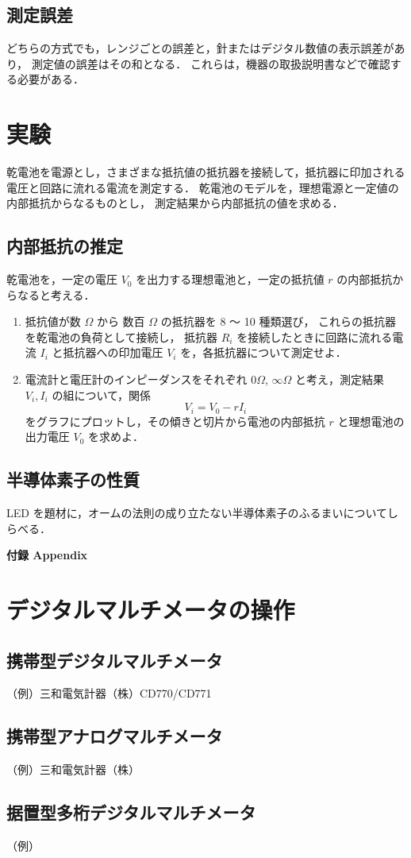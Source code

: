 \documentclass[11pt,sort]{jarticle}
\begin{document}
\subsection{測定誤差}

どちらの方式でも，レンジごとの誤差と，針またはデジタル数値の表示誤差があり，
測定値の誤差はその和となる．
これらは，機器の取扱説明書などで確認する必要がある．

\newpage
\section{実験}

乾電池を電源とし，さまざまな抵抗値の抵抗器を接続して，抵抗器に印加される電圧と回路に流れる電流を測定する．
乾電池のモデルを，理想電源と一定値の内部抵抗からなるものとし，
測定結果から内部抵抗の値を求める．

\subsection{内部抵抗の推定}\label{a}

乾電池を，一定の電圧 $V_0$ を出力する理想電池と，一定の抵抗値 $r$ の内部抵抗からなると考える．

\begin{enumerate}
\item
抵抗値が数 $\Omega$ から 数百 $\Omega$ の抵抗器を 8 〜 10 種類選び，
これらの抵抗器を乾電池の負荷として接続し，
抵抗器 $R_i$ を接続したときに回路に流れる電流 $I_i$ と抵抗器への印加電圧 $V_i$ を，各抵抗器について測定せよ．
\item
電流計と電圧計のインピーダンスをそれぞれ $0 \Omega$, $\infty \Omega$ と考え，測定結果 $V_i, I_i$ の組について，関係
\[
V_i = V_0 - r I_i
\]
をグラフにプロットし，その傾きと切片から電池の内部抵抗 $r$ と理想電池の出力電圧 $V_0$ を求めよ．
\end{enumerate}


\subsection{半導体素子の性質}\label{b}

LED を題材に，オームの法則の成り立たない半導体素子のふるまいについてしらべる．





\newpage
\appendix
\noindent
{\LARGE\bf 付録 Appendix}

\section{デジタルマルチメータの操作}

\subsection{携帯型デジタルマルチメータ}
（例）三和電気計器（株）CD770/CD771

\subsection{携帯型アナログマルチメータ}
（例）三和電気計器（株）

\subsection{据置型多桁デジタルマルチメータ}
（例）
\end{document}
